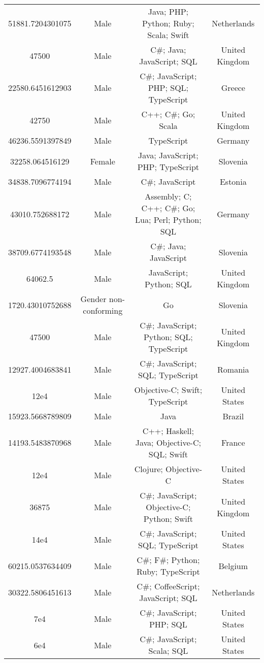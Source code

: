 \begin{center}
\begin{tabular}{ |c|c|c|c| }
51881.7204301075  &  Male  &  Java; PHP; Python; Ruby; Scala; Swift  &  Netherlands  \\ 
47500  &  Male  &  C\#; Java; JavaScript; SQL  &  United Kingdom  \\ 
22580.6451612903  &  Male  &  C\#; JavaScript; PHP; SQL; TypeScript  &  Greece  \\ 
42750  &  Male  &  C++; C\#; Go; Scala  &  United Kingdom  \\ 
46236.5591397849  &  Male  &  TypeScript  &  Germany  \\ 
32258.064516129  &  Female  &  Java; JavaScript; PHP; TypeScript  &  Slovenia  \\ 
34838.7096774194  &  Male  &  C\#; JavaScript  &  Estonia  \\ 
43010.752688172  &  Male  &  Assembly; C; C++; C\#; Go; Lua; Perl; Python; SQL  &  Germany  \\ 
38709.6774193548  &  Male  &  C\#; Java; JavaScript  &  Slovenia  \\ 
64062.5  &  Male  &  JavaScript; Python; SQL  &  United Kingdom  \\ 
1720.43010752688  &  Gender non-conforming  &  Go  &  Slovenia  \\ 
47500  &  Male  &  C\#; JavaScript; Python; SQL; TypeScript  &  United Kingdom  \\ 
12927.4004683841  &  Male  &  C\#; JavaScript; SQL; TypeScript  &  Romania  \\ 
12e4  &  Male  &  Objective-C; Swift; TypeScript  &  United States  \\ 
15923.5668789809  &  Male  &  Java  &  Brazil  \\ 
14193.5483870968  &  Male  &  C++; Haskell; Java; Objective-C; SQL; Swift  &  France  \\ 
12e4  &  Male  &  Clojure; Objective-C  &  United States  \\ 
36875  &  Male  &  C\#; JavaScript; Objective-C; Python; Swift  &  United Kingdom  \\ 
14e4  &  Male  &  C\#; JavaScript; SQL; TypeScript  &  United States  \\ 
60215.0537634409  &  Male  &  C\#; F\#; Python; Ruby; TypeScript  &  Belgium  \\ 
30322.5806451613  &  Male  &  C\#; CoffeeScript; JavaScript; SQL  &  Netherlands  \\ 
7e4  &  Male  &  C\#; JavaScript; PHP; SQL  &  United States  \\ 
6e4  &  Male  &  C\#; JavaScript; Scala; SQL  &  United States  \\ 

\end{tabular}
\end{center}
